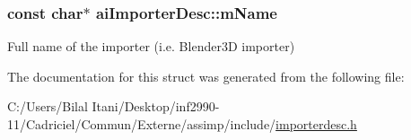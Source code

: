 \subsubsection[{\texorpdfstring{m\+Name}{mName}}]{\setlength{\rightskip}{0pt plus 5cm}const char$\ast$ ai\+Importer\+Desc\+::m\+Name}\hypertarget{structai_importer_desc_a2a9d5fd818c01bba1a0a782722ab9495}{}\label{structai_importer_desc_a2a9d5fd818c01bba1a0a782722ab9495}
Full name of the importer (i.\+e. Blender3D importer) 

The documentation for this struct was generated from the following file\+:\begin{DoxyCompactItemize}
\item 
C\+:/\+Users/\+Bilal Itani/\+Desktop/inf2990-\/11/\+Cadriciel/\+Commun/\+Externe/assimp/include/\hyperlink{importerdesc_8h}{importerdesc.\+h}\end{DoxyCompactItemize}
